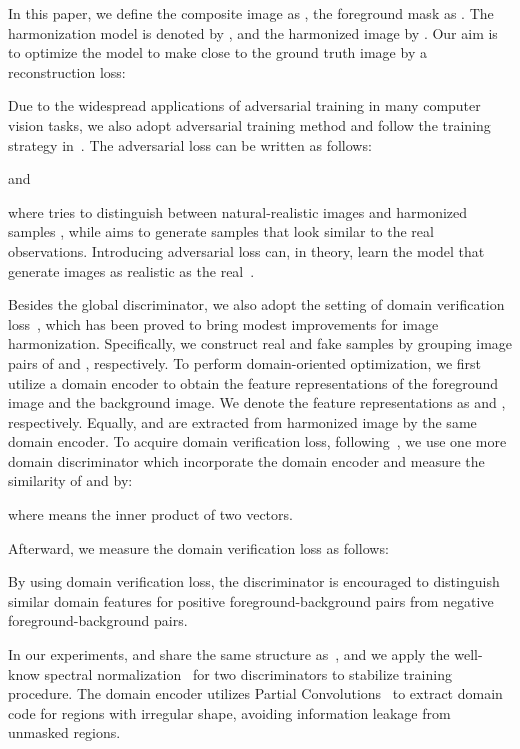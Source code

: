 \documentclass[final]{cvpr}
\begin{document}
In this paper, we define the composite image as , the foreground mask as . The harmonization model is denoted by , and the harmonized image by . Our aim is to optimize the model  to make  close to the ground truth image  by a reconstruction loss: 



Due to the widespread applications of adversarial training in many computer vision tasks, we also adopt adversarial training method and follow the training strategy in~\cite{cong2020dovenet,cun2020improving}. The adversarial loss can be written as follows:

and

where  tries to distinguish between natural-realistic images  and harmonized samples , while  aims to generate samples that look similar to the real observations. Introducing adversarial loss can, in theory, learn the model  that generate images as realistic as the real~\cite{goodfellow2014generative,isola2017image}. 

Besides the global discriminator, we also adopt the setting of domain verification loss~\cite{cong2020dovenet}, which has been proved to bring modest improvements for image harmonization. Specifically, we construct real and fake samples by grouping image pairs of  and , respectively. To perform domain-oriented optimization, we first utilize a domain encoder  to obtain the feature representations of the foreground image and the background image. We denote the feature representations as  and , respectively. Equally,  and  are extracted from harmonized image  by the same domain encoder. To acquire domain verification loss, following~\cite{cong2020dovenet}, we use one more domain discriminator  which incorporate the domain encoder  and measure the similarity of  and  by:

where  means the inner product of two vectors.

Afterward, we measure the domain verification loss as follows: 


By using domain verification loss, the discriminator is encouraged to distinguish similar domain features for positive foreground-background pairs from negative foreground-background pairs. 

In our experiments,  and  share the same structure as~\cite{cong2020dovenet}, and we apply the well-know spectral normalization~\cite{miyato2018spectral} for two discriminators to stabilize training procedure. The domain encoder utilizes Partial Convolutions~\cite{liu2018image} to extract domain code for regions with irregular shape, avoiding information leakage from unmasked regions. 
\end{document}
